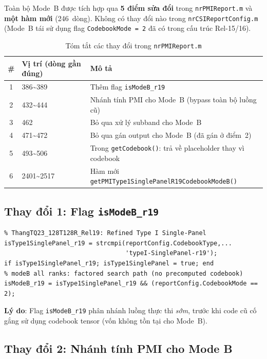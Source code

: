 \documentclass[11pt,a4paper]{article}
\begin{document}
Toàn bộ Mode~B được tích hợp qua \textbf{5 điểm sửa đổi} trong
\texttt{nrPMIReport.m} và \textbf{một hàm mới} (246~dòng).
Không có thay đổi nào trong \texttt{nrCSIReportConfig.m}
(Mode~B tái sử dụng flag \texttt{CodebookMode = 2}
đã có trong cấu trúc Rel-15/16).

\begin{table}[H]
\centering
\caption{Tóm tắt các thay đổi trong \texttt{nrPMIReport.m}}
\begin{tabular}{cll}
\toprule
\# & Vị trí (dòng gần đúng) & Mô tả \\
\midrule
1 & 386\textasciitilde389 & Thêm flag \texttt{isModeB\_r19} \\
2 & 432\textasciitilde444 & Nhánh tính PMI cho Mode~B (bypass toàn bộ luồng cũ) \\
3 & 462 & Bỏ qua xử lý subband cho Mode~B \\
4 & 471\textasciitilde472 & Bỏ qua gán output cho Mode~B (đã gán ở điểm~2) \\
5 & 493\textasciitilde506 & Trong \texttt{getCodebook()}: trả về placeholder thay vì codebook \\
6 & 2401\textasciitilde2517 & Hàm mới \texttt{getPMIType1SinglePanelR19CodebookModeB()} \\
\bottomrule
\end{tabular}
\end{table}

\subsection{Thay đổi 1: Flag \texttt{isModeB\_r19}}

\begin{lstlisting}
% ThangTQ23_128T128R_Rel19: Refined Type I Single-Panel
isType1SinglePanel_r19 = strcmpi(reportConfig.CodebookType,...
                                 'typeI-SinglePanel-r19');
if isType1SinglePanel_r19; isType1SinglePanel = true; end
% modeB all ranks: factored search path (no precomputed codebook)
isModeB_r19 = isType1SinglePanel_r19 && (reportConfig.CodebookMode == 2);
\end{lstlisting}

\noindent\textbf{Lý do}: Flag \texttt{isModeB\_r19} phân nhánh luồng thực thi
\emph{sớm}, trước khi code cũ cố gắng sử dụng codebook tensor
(vốn không tồn tại cho Mode~B).

\subsection{Thay đổi 2: Nhánh tính PMI cho Mode B}
\end{document}
